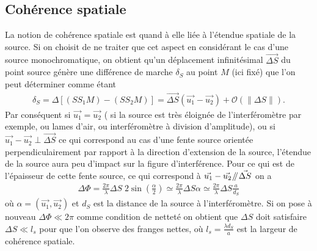 \documentclass[12pt,prb,aps,epsf]{report}
\begin{document}
\subsection{Cohérence spatiale}
La notion de cohérence spatiale est quand à elle liée à l'étendue spatiale de la source. Si on choisit de ne traiter que cet aspect en considérant le cas d'une source monochromatique, on obtient qu'un déplacement infinitésimal $\vec{\Delta S}$ du point source génère une différence de marche $\delta_S$ au point $M$ (ici fixé) que l'on peut déterminer comme étant
\begin{eqnarray}
\delta_S = \Delta[(SS_1M)-(SS_2M)] = \vec{\Delta S}(\vec{u_1}-\vec{u_2}) + \mathcal{O}(\|\Delta S\|).
\end{eqnarray}
Par conséquent si $\vec{u_1}=\vec{u_2}$ ( si la source est très éloignée de l'interféromètre par exemple, ou lames d'air, ou interféromètre à division d'amplitude), ou si $\vec{u_1}-\vec{u_2} \perp \vec{\Delta S}$ ce qui correspond au cas d'une fente source orientée perpendiculairement par rapport à la direction d'extension de la source, l'étendue de la source aura peu d'impact sur la figure d'interférence. Pour ce qui est de l'épaisseur de cette fente source, ce qui correspond à $\vec{u_1}-\vec{u_2} \mathbin{\!/\mkern-5mu/\!} \vec{\Delta S}$ on a 
\begin{eqnarray}
\Delta\Phi = \frac{2\pi}{\lambda} \Delta S \; 2 \sin\left( \frac{\alpha}{2} \right) \simeq \frac{2\pi}{\lambda} \Delta S  \alpha \simeq \frac{2\pi}{\lambda} \Delta S  \frac{a}{d_S}
\end{eqnarray}
où $\alpha =(\vec{u_1},\vec{u_2})$ et $d_S$ est la distance de la source à l'interféromètre. Si on pose à nouveau $\Delta\Phi \ll 2\pi$ comme condition de netteté on obtient que $\Delta S$ doit satisfaire $\Delta S \ll l_s$ pour que l'on observe des franges nettes, où $l_s=\frac{\lambda d_S}{a}$ est la largeur de cohérence spatiale.
\end{document}
